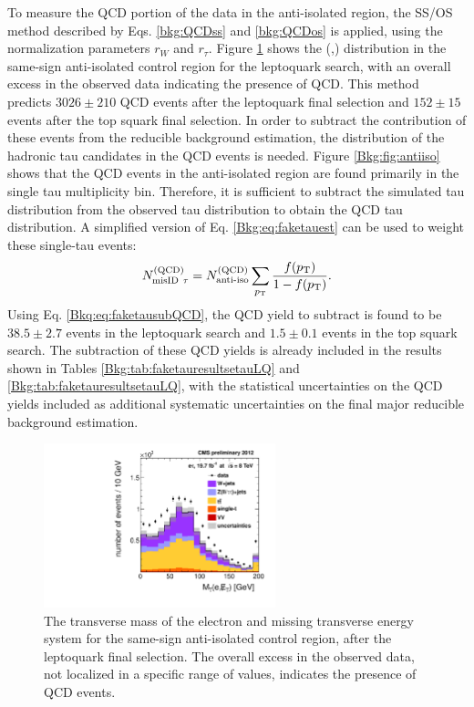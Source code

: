 To measure the QCD portion of the data in the anti-isolated region, the SS/OS method described by Eqs. \eqref{bkg:QCDss} and \eqref{bkg:QCDos} is applied, using the normalization parameters $r_{W}$ and $r_{\tau}$. Figure \ref{fig:QCDSSAiso} shows the \MT(\Pe,\met) distribution in the same-sign anti-isolated control region for the leptoquark search, with an overall excess in the observed data indicating the presence of QCD. This method predicts $3026\pm210$ QCD events after the leptoquark final selection and $152\pm15$ events after the top squark final selection. In order to subtract the contribution of these events from the reducible background estimation, the \pt distribution of the hadronic tau candidates in the QCD events is needed. Figure \ref{Bkg:fig:antiiso} shows that the QCD events in the \etau anti-isolated region are found primarily in the single tau multiplicity bin. Therefore, it is sufficient to subtract the simulated tau \pt distribution from the observed tau \pt distribution to obtain the QCD tau \pt distribution. A simplified version of Eq. \eqref{Bkg:eq:faketauest} can be used to weight these single-tau events:
\begin{equation}
N_{\text{misID}~\tau}^{\text{(QCD)}} = N_{\text{anti-iso}}^{\text{(QCD)}} \sum_{p_{\mathrm{T}}}{\frac{f(p_{\mathrm{T}})}{1-f(p_{\mathrm{T}})}}. \label{Bkq:eq:faketausubQCD}
\end{equation}
Using Eq. \eqref{Bkq:eq:faketausubQCD}, the QCD yield to subtract is found to be $38.5\pm2.7$ events in the leptoquark search and $1.5\pm0.1$ events in the top squark search. The subtraction of these QCD yields is already included in the results shown in Tables \ref{Bkg:tab:faketauresultsetauLQ} and \ref{Bkg:tab:faketauresultsetauLQ}, with the statistical uncertainties on the QCD yields included as additional systematic uncertainties on the final major reducible background estimation.

\begin{figure}[hbt]
  \begin{center}
    \includegraphics[width=0.6\textwidth]{figures/etau/eMETTMassSSAIsoFinal.pdf}
    \caption{The transverse mass of the electron and missing transverse energy system for the same-sign anti-isolated control region, after the leptoquark final selection. The overall excess in the observed data, not localized in a specific range of \MT values, indicates the presence of QCD events.}
    \label{fig:QCDSSAiso}
  \end{center}
\end{figure}

